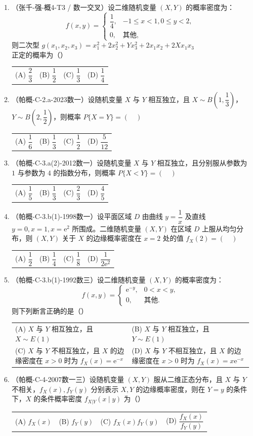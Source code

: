 \documentclass[12pt,a4paper]{ctexart}
\makeatletter
\newcommand{\optfour}[4]{\par\begin{tabularx}{\linewidth}{@{}X@{\quad}X@{\quad}X@{\quad}X@{}}#1&#2&#3&#4\end{tabularx}}
\newcommand{\opttwo}[4]{\par\begin{tabularx}{\linewidth}{@{}X@{\quad}X@{}}#1&#2\\[0.8em]#3&#4\end{tabularx}}
\makeatother
\begin{document}
\begin{enumerate}[label=\arabic*.]
\item（张千-强-概4-T3 / 数一交叉）设二维随机变量 $(X, Y)$ 的概率密度为：
\[
f(x, y) = \begin{cases} \dfrac{1}{4}, & -1 \leqslant x < 1, 0 \leqslant y < 2, \\ 0, & \text{其他}, \end{cases}
\]
则二次型 $g(x_1, x_2, x_3) = x_1^2 + 2x_2^2 + Yx_3^2 + 2x_1x_2 + 2Xx_1x_3$ 正定的概率为（\quad）
\optfour{(A) $\dfrac{2}{3}$}{(B) $\dfrac{1}{2}$}{(C) $\dfrac{1}{3}$}{(D) $\dfrac{1}{4}$}

\item（帕概-C-2.a-2023数一）设随机变量 $X$ 与 $Y$ 相互独立，且 $X \sim B\left(1, \dfrac{1}{3}\right)$，$Y \sim B\left(2, \dfrac{1}{2}\right)$，则概率 $P\{X = Y\} = (\quad)$
\optfour{(A) $\dfrac{1}{6}$}{(B) $\dfrac{1}{3}$}{(C) $\dfrac{1}{2}$}{(D) $\dfrac{5}{12}$}

\item（帕概-C-3.a(2)-2012数一）设随机变量 $X$ 与 $Y$ 相互独立，且分别服从参数为 $1$ 与参数为 $4$ 的指数分布，则概率 $P\{X < Y\} = (\quad)$
\optfour{(A) $\dfrac{1}{5}$}{(B) $\dfrac{1}{3}$}{(C) $\dfrac{2}{3}$}{(D) $\dfrac{4}{5}$}

\item（帕概-C-3.b(1)-1998数一）设平面区域 $D$ 由曲线 $y = \dfrac{1}{x}$ 及直线 $y = 0, x = 1, x = \mathrm{e}^{2}$ 所围成。二维随机变量 $(X, Y)$ 在区域 $D$ 上服从均匀分布，则 $(X, Y)$ 关于 $X$ 的边缘概率密度在 $x = 2$ 处的值 $f_{X}(2) = (\quad)$
\optfour{(A) $\dfrac{1}{2}$}{(B) $\dfrac{1}{4}$}{(C) $\dfrac{1}{8}$}{(D) $\dfrac{1}{2\mathrm{e}^{2}}$}

\item（帕概-C-3.b(1)-1992数三）设二维随机变量 $(X, Y)$ 的概率密度为：
\[
f(x, y) = \begin{cases} \mathrm{e}^{-y}, & 0 < x < y, \\ 0, & \text{其他}. \end{cases}
\]
则下列断言正确的是（\quad）
\opttwo{(A) $X$ 与 $Y$ 相互独立，且 $X \sim E(1)$}{(B) $X$ 与 $Y$ 相互独立，且 $Y \sim E(1)$}{(C) $X$ 与 $Y$ 不相互独立，且 $X$ 的边缘密度在 $x > 0$ 时为 $f_{X}(x) = \mathrm{e}^{-x}$}{(D) $X$ 与 $Y$ 不相互独立，且 $X$ 的边缘密度在 $x > 0$ 时为 $f_{X}(x) = x\mathrm{e}^{-x}$}

\item（帕概-C-4-2007数一三）设随机变量 $(X, Y)$ 服从二维正态分布，且 $X$ 与 $Y$ 不相关，$f_{X}(x), f_{Y}(y)$ 分别表示 $X, Y$ 的边缘概率密度，则在 $Y = y$ 的条件下，$X$ 的条件概率密度 $f_{X|Y}(x \mid y)$ 为（\quad）
\optfour{(A) $f_{X}(x)$}{(B) $f_{Y}(y)$}{(C) $f_{X}(x)f_{Y}(y)$}{(D) $\dfrac{f_{X}(x)}{f_{Y}(y)}$}


\end{enumerate}
\end{document}

